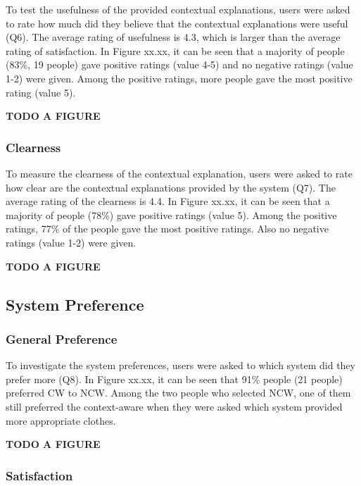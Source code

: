 To test the usefulness of the provided contextual explanations, users were asked to rate how much did they believe that the contextual explanations were useful (Q6). The average rating of usefulness is 4.3, which is larger than the average rating of satisfaction. In Figure xx.xx, it can be seen that a majority of people (83\%, 19 people) gave positive ratings (value 4-5) and no negative ratings (value 1-2) were given. Among the positive ratings, more people gave the most positive rating (value 5).

\textbf{TODO A FIGURE}

\subsubsection{Clearness} \label{sec:results_eb_c}

To measure the clearness of the contextual explanation, users were asked to rate how clear are the contextual explanations provided by the system (Q7). The average rating of the clearness is 4.4. In Figure xx.xx, it can be seen that a majority of people (78\%) gave positive ratings (value 5). Among the positive ratings, 77\% of the people gave the most positive ratings. Also no negative ratings (value 1-2) were given. 

\textbf{TODO A FIGURE}

\subsection{System Preference} \label{sec:results_sp}

\subsubsection{General Preference} \label{sec:results_sp_gp}

To investigate the system preferences, users were asked to which system did they prefer more (Q8). In Figure xx.xx, it can be seen that 91\% people (21 people) preferred CW to NCW. Among the two people who selected NCW, one of them still preferred the context-aware when they were asked which system provided more appropriate clothes.

\textbf{TODO A FIGURE}

\subsubsection{Satisfaction} \label{sec:results_sp_s}

